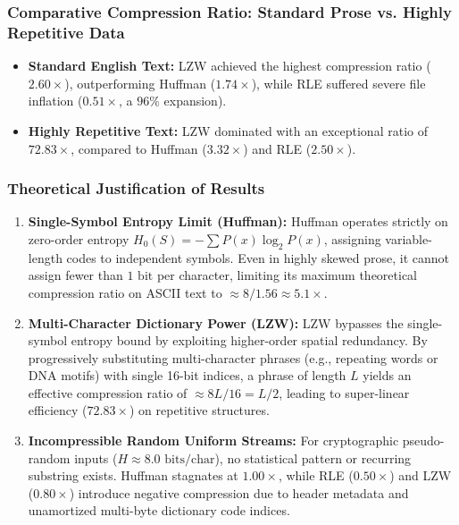\documentclass{article}
\begin{document}
\subsubsection{Comparative Compression Ratio: Standard Prose vs. Highly Repetitive Data}
\begin{itemize}
    \item \textbf{Standard English Text:} LZW achieved the highest compression ratio ($2.60\times$), outperforming Huffman ($1.74\times$), while RLE suffered severe file inflation ($0.51\times$, a $96\%$ expansion).
    \item \textbf{Highly Repetitive Text:} LZW dominated with an exceptional ratio of $\mathbf{72.83\times}$, compared to Huffman ($3.32\times$) and RLE ($2.50\times$).
\end{itemize}

\subsubsection{Theoretical Justification of Results}
\begin{enumerate}
    \item \textbf{Single-Symbol Entropy Limit (Huffman):} Huffman operates strictly on zero-order entropy $H_0(S) = -\sum P(x)\log_2 P(x)$, assigning variable-length codes to independent symbols. Even in highly skewed prose, it cannot assign fewer than $1\text{ bit}$ per character, limiting its maximum theoretical compression ratio on ASCII text to $\approx 8 / 1.56 \approx 5.1\times$.
    \item \textbf{Multi-Character Dictionary Power (LZW):} LZW bypasses the single-symbol entropy bound by exploiting higher-order spatial redundancy. By progressively substituting multi-character phrases (e.g., repeating words or DNA motifs) with single 16-bit indices, a phrase of length $L$ yields an effective compression ratio of $\approx 8L / 16 = L/2$, leading to super-linear efficiency ($72.83\times$) on repetitive structures.
    \item \textbf{Incompressible Random Uniform Streams:} For cryptographic pseudo-random inputs ($H \approx 8.0\text{ bits/char}$), no statistical pattern or recurring substring exists. Huffman stagnates at $1.00\times$, while RLE ($0.50\times$) and LZW ($0.80\times$) introduce negative compression due to header metadata and unamortized multi-byte dictionary code indices.
\end{enumerate}

\cleardoublepage
\newpage
\end{document}
